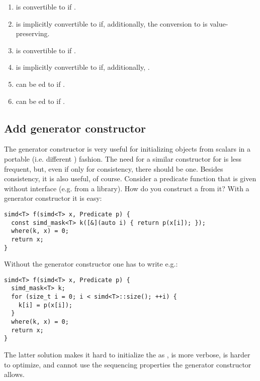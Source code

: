 \begin{enumerate}
  \item {} is convertible to  if
    .

  \item {} is implicitly convertible to 
    if, additionally, the conversion  to  is
    value-preserving.

  \item {} is convertible to  if
    .

  \item {} is implicitly convertible to
     if, additionally, .

  \item {} can be ed to  if
    .

  \item {} can be ed to  if
    .
\end{enumerate}

\subsection{Add  generator constructor}
The  generator constructor is very useful for initializing objects
from scalars in a portable (i.e. different ) fashion.
The need for a similar constructor for  is less frequent, but,
even if only for consistency, there should be one.
Besides consistency, it is also useful, of course.
Consider a predicate function that is given without  interface (e.g. from a library).
How do you construct a  from it?
With a generator constructor it is easy:
\medskip\begin{lstlisting}[style=Vc]
simd<T> f(simd<T> x, Predicate p) {
  const simd_mask<T> k([&](auto i) { return p(x[i]); });
  where(k, x) = 0;
  return x;
}
\end{lstlisting}
Without the generator constructor one has to write e.g.:
\medskip\begin{lstlisting}[style=Vc]
simd<T> f(simd<T> x, Predicate p) {
  simd_mask<T> k;
  for (size_t i = 0; i < simd<T>::size(); ++i) {
    k[i] = p(x[i]);
  }
  where(k, x) = 0;
  return x;
}
\end{lstlisting}
The latter solution makes it hard to initialize the  as , is more verbose, is harder to optimize, and cannot use the sequencing properties the generator constructor allows.

